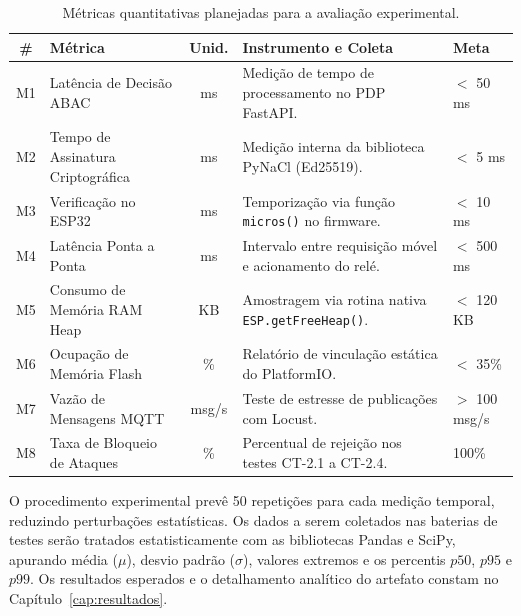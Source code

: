 \begin{table}[htbp]
\centering
\footnotesize
\caption{Métricas quantitativas planejadas para a avaliação experimental.}
\label{quadro:metricas-avaliacao}
\begin{tabularx}{\textwidth}{c p{4.2cm} c X p{2.2cm}}
\toprule
\textbf{\#} & \textbf{Métrica} & \textbf{Unid.} & \textbf{Instrumento e Coleta} & \textbf{Meta} \\
\midrule
M1 & Latência de Decisão ABAC & ms & Medição de tempo de processamento no PDP FastAPI. & $<$ 50 ms \\
M2 & Tempo de Assinatura Criptográfica & ms & Medição interna da biblioteca PyNaCl (Ed25519). & $<$ 5 ms \\
M3 & Verificação no ESP32 & ms & Temporização via função \texttt{micros()} no firmware. & $<$ 10 ms \\
M4 & Latência Ponta a Ponta & ms & Intervalo entre requisição móvel e acionamento do relé. & $<$ 500 ms \\
M5 & Consumo de Memória RAM Heap & KB & Amostragem via rotina nativa \texttt{ESP.getFreeHeap()}. & $<$ 120 KB \\
M6 & Ocupação de Memória Flash & \% & Relatório de vinculação estática do PlatformIO. & $<$ 35\% \\
M7 & Vazão de Mensagens MQTT & msg/s & Teste de estresse de publicações com Locust. & $>$ 100 msg/s \\
M8 & Taxa de Bloqueio de Ataques & \% & Percentual de rejeição nos testes CT-2.1 a CT-2.4. & 100\% \\
\bottomrule
\end{tabularx}
\end{table}

\label{subsec:procedimento-experimental}
O procedimento experimental prevê 50 repetições para cada medição temporal, reduzindo perturbações estatísticas. Os dados a serem coletados nas baterias de testes serão tratados estatisticamente com as bibliotecas Pandas e SciPy, apurando média ($\mu$), desvio padrão ($\sigma$), valores extremos e os percentis $p50$, $p95$ e $p99$. Os resultados esperados e o detalhamento analítico do artefato constam no Capítulo~\ref{cap:resultados}.
